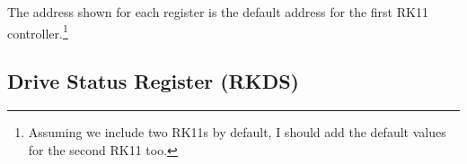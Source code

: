 The address shown for each register is the default address for the
first RK11 controller.\footnote{Assuming we include two RK11s by
  default, I should add the default values for the second RK11 too.}

\subsection{Drive Status Register (RKDS)}

\begin{register16}
\end{register16}


